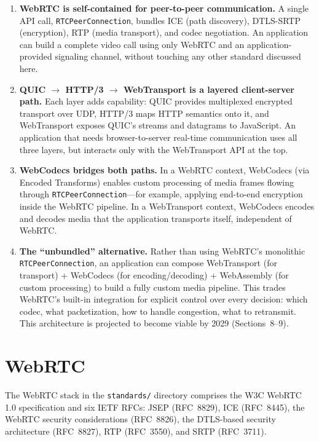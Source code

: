 \documentclass[11pt]{article}
\begin{document}
\begin{enumerate}
  \item \textbf{WebRTC is self-contained for peer-to-peer communication.}
    A single API call, \texttt{RTCPeerConnection}, bundles ICE (path
    discovery), DTLS-SRTP (encryption), RTP (media transport), and codec
    negotiation.  An application can build a complete video call using only
    WebRTC and an application-provided signaling channel, without touching
    any other standard discussed here.

  \item \textbf{QUIC $\to$ HTTP/3 $\to$ WebTransport is a layered
    client-server path.}  Each layer adds capability: QUIC provides
    multiplexed encrypted transport over UDP, HTTP/3 maps HTTP semantics
    onto it, and WebTransport exposes QUIC's streams and datagrams to
    JavaScript.  An application that needs browser-to-server real-time
    communication uses all three layers, but interacts only with the
    WebTransport API at the top.

  \item \textbf{WebCodecs bridges both paths.}  In a WebRTC context,
    WebCodecs (via Encoded Transforms) enables custom processing of media
    frames flowing through \texttt{RTCPeerConnection}---for example,
    applying end-to-end encryption inside the WebRTC pipeline.  In a
    WebTransport context, WebCodecs encodes and decodes media that the
    application transports itself, independent of WebRTC.

  \item \textbf{The ``unbundled'' alternative.}  Rather than using WebRTC's
    monolithic \texttt{RTCPeerConnection}, an application can compose
    WebTransport (for transport) + WebCodecs (for encoding/decoding) +
    WebAssembly (for custom processing) to build a fully custom media
    pipeline.  This trades WebRTC's built-in integration for explicit control
    over every decision: which codec, what packetization, how to handle
    congestion, what to retransmit.  This architecture is projected to become
    viable by 2029 (Sections~8--9).
\end{enumerate}

\section{WebRTC}

The WebRTC stack in the \texttt{standards/} directory comprises the W3C
WebRTC 1.0 specification and six IETF RFCs: JSEP (RFC~8829), ICE
(RFC~8445), the WebRTC security considerations (RFC~8826), the DTLS-based
security architecture (RFC~8827), RTP (RFC~3550), and SRTP (RFC~3711).
\end{document}
